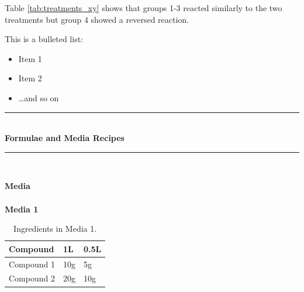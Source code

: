 \documentclass[15pt,idxtotoc,hyperref,openany]{labbook} %
\newcommand{\HRule}{\rule{\linewidth}{0.5mm}} %
\begin{document}
Table \ref{tab:treatments_xy} shows that groups 1-3 reacted similarly to the two treatments but group 4 showed a reversed reaction.




This is a bulleted list:

\begin{itemize}
\item Item 1
\item Item 2
\item \ldots and so on
\end{itemize}



\lipsum[6]



\lipsum[7]


\labday{} %

\begin{center}
\HRule \\[0.4cm]
{\huge \textbf{Formulae and Media Recipes}}\\[0.4cm] %
\HRule \\[1.5cm]
\end{center}


\newpage

\huge \textbf{Media} \\ \\

\normalsize \textbf{Media 1}\\
\begin{table}[H]
\begin{tabular}{l l l}
\toprule
\textbf{Compound} & \textbf{1L} & \textbf{0.5L}\\
\toprule
Compound 1 & 10g & 5g\\
Compound 2 & 20g & 10g\\
\bottomrule
\end{tabular}
\caption{Ingredients in Media 1.}
\label{tab:med1}
\end{table}
\end{document}
